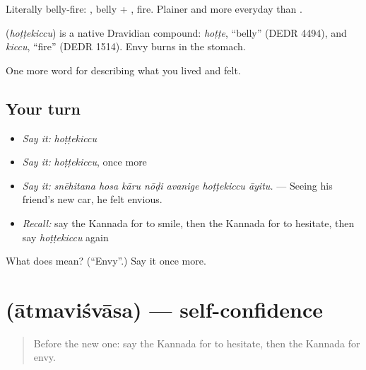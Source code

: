 Literally belly-fire: , belly + , fire. Plainer and more everyday than .

\begin{cousinweb}
\textbf{} (\emph{hoṭṭekiccu}) is a native Dravidian compound: \emph{hoṭṭe}, \textquotedblleft{}belly\textquotedblright{} (DEDR 4494), and \emph{kiccu}, \textquotedblleft{}fire\textquotedblright{} (DEDR 1514). Envy burns in the stomach.
\end{cousinweb}

\begin{grammarlens}[title={What you've built}]
One more word for describing what you lived and felt.
\end{grammarlens}

\subsection*{Your turn}
\begin{itemize}
\raggedright
  \item \emph{Say it:} \emph{hoṭṭekiccu}
  \item \emph{Say it:} \emph{hoṭṭekiccu}, once more
  \item \emph{Say it:} \emph{snēhitana hosa kāru nōḍi avanige hoṭṭekiccu āyitu.} — Seeing his friend's new car, he felt envious.
  \item \emph{Recall:} say the Kannada for to smile, then the Kannada for to hesitate, then say \emph{hoṭṭekiccu} again
\end{itemize}

\begin{tcolorbox}[breakable,colback=teal!4,colframe=teal!35!black,title={Before you move on}]
What does  mean? (\textquotedblleft{}Envy\textquotedblright{}.) Say it once more.
\end{tcolorbox}
\section[\texorpdfstring{\kn{ಆತ್ಮವಿಶ್ವಾಸ} (ātmaviśvāsa)}{ಆತ್ಮವಿಶ್ವಾಸ (ātmaviśvāsa)}]{ (ātmaviśvāsa) — self-confidence}

\label{lesson:KA-C499-atmavisvasa}



\begin{quote}
Before the new one: say the Kannada for to hesitate, then the Kannada for envy.
\end{quote}

